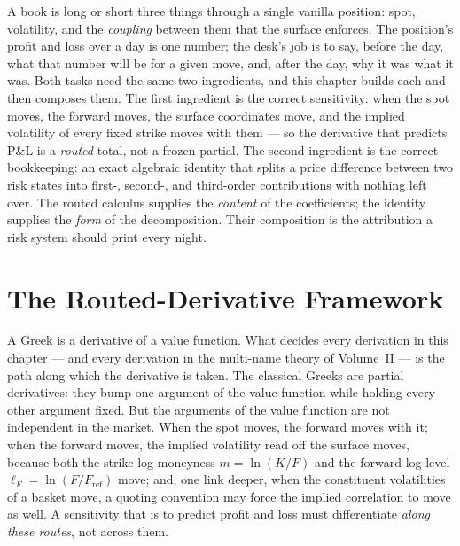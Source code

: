 \documentclass[11pt]{book}
\theoremstyle{plain}
\theoremstyle{definition}
\theoremstyle{remark}
\newcommand{\mln}{m}                             %
\newcommand{\lF}{\ell_F}                         %
\newcommand{\Fref}{F_{\mathrm{ref}}}             %
\begin{document}
A book is long or short three things through a single vanilla position: spot,
volatility, and the \emph{coupling} between them that the surface enforces.
The position's profit and loss over a day is one number; the desk's job is to
say, before the day, what that number will be for a given move, and, after the
day, why it was what it was. Both tasks need the same two ingredients, and
this chapter builds each and then composes them. The first ingredient is the
correct sensitivity: when the spot moves, the forward moves, the surface
coordinates move, and the implied volatility of every fixed strike moves with
them --- so the derivative that predicts P\&L is a \emph{routed} total, not a
frozen partial. The second ingredient is the correct bookkeeping: an exact
algebraic identity that splits a price difference between two risk states into
first-, second-, and third-order contributions with nothing left over. The
routed calculus supplies the \emph{content} of the coefficients; the identity
supplies the \emph{form} of the decomposition. Their composition is the
attribution a risk system should print every night.


\section{The Routed-Derivative Framework}\label{sec:spine:framework}

A Greek is a derivative of a value function. What decides every
derivation in this chapter --- and every derivation in the multi-name theory
of Volume~II --- is the path along which the derivative is taken. The
classical Greeks are partial derivatives: they bump one argument of the value
function while holding every other argument fixed. But the arguments of the
value function are not independent in the market. When the spot moves, the
forward moves with it; when the forward moves, the implied volatility read off
the surface moves, because both the strike log-moneyness $\mln = \ln(K/F)$ and
the forward log-level $\lF = \ln(F/\Fref)$ move; and, one link deeper, when
the constituent volatilities of a basket move, a quoting convention may force
the implied correlation to move as well. A sensitivity that is to predict
profit and loss must differentiate \emph{along these routes}, not across them.
\end{document}
